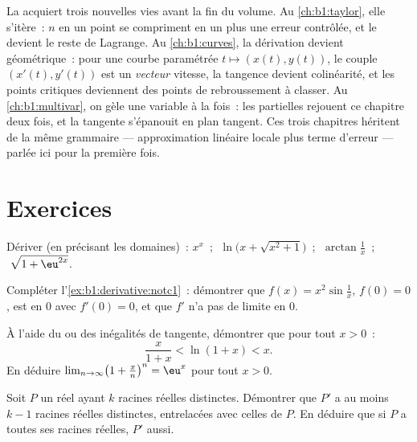 \begin{remark}
La  acquiert trois nouvelles vies avant la fin du volume.
Au \cref{ch:b1:taylor}, elle s'itère~: $n$  en un point
se compriment en un  plus une erreur contrôlée, et le
 devient le reste de Lagrange. Au
\cref{ch:b1:curves}, la dérivation devient géométrique~: pour une
courbe paramétrée $t \mapsto (x(t), y(t))$, le couple $(x'(t),
y'(t))$ est un \emph{vecteur} vitesse, la tangence devient
colinéarité, et les points critiques deviennent des points de rebroussement à
classer. Au \cref{ch:b1:multivar}, on gèle une variable à la fois~: les
 partielles rejouent ce chapitre deux fois, et la tangente
s'épanouit en plan tangent. Ces trois chapitres héritent de la même
grammaire --- approximation linéaire locale plus terme d'erreur ---
parlée ici pour la première fois.
\end{remark}

\section{Exercices}

\begin{exercise}[$\star$]\label{exo:b1:derivative:1}
Dériver (en précisant les domaines)~: $x^x$~;
$\;\ln\bigl(x + \sqrt{x^2+1}\bigr)$~; $\;\arctan\frac{1}{x}$~;
$\;\sqrt{1 + \eu^{2x}}$.
\end{exercise}

\begin{exercise}[$\star$]\label{exo:b1:derivative:2}
Compléter l'\cref{ex:b1:derivative:notc1}~: démontrer que $f(x) = x^2
\sin\frac1x$, $f(0) = 0$, est  en $0$ avec $f'(0) = 0$,
et que $f'$ n'a pas de limite en $0$.
\end{exercise}

\begin{exercise}[$\star$]\label{exo:b1:derivative:3}
À l'aide du  ou des inégalités de tangente,
démontrer que pour tout $x > 0$~:
\[
\frac{x}{1 + x} < \ln(1 + x) < x .
\]
En déduire $\lim_{n\to\infty} \bigl(1 + \frac xn\bigr)^n = \eu^x$ pour
tout $x > 0$.
\end{exercise}

\begin{exercise}[$\star$]\label{exo:b1:derivative:4}
Soit $P$ un  réel ayant $k$ racines réelles distinctes. Démontrer que
$P'$ a au moins $k - 1$ racines réelles distinctes, entrelacées avec celles
de $P$. En déduire que si $P$ a toutes ses racines réelles, $P'$ aussi.
\end{exercise}

